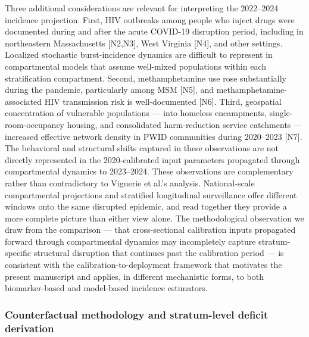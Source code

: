 \documentclass[11pt]{article}
\begin{document}
Three additional considerations are relevant for interpreting the 2022–2024 incidence projection. First, HIV outbreaks among people who inject drugs were documented during and after the acute COVID-19 disruption period, including in northeastern Massachusetts [N2,N3], West Virginia [N4], and other settings. Localized stochastic burst-incidence dynamics are difficult to represent in compartmental models that assume well-mixed populations within each stratification compartment. Second, methamphetamine use rose substantially during the pandemic, particularly among MSM [N5], and methamphetamine-associated HIV transmission risk is well-documented [N6]. Third, geospatial concentration of vulnerable populations — into homeless encampments, single-room-occupancy housing, and consolidated harm-reduction service catchments — increased effective network density in PWID communities during 2020–2023 [N7]. The behavioral and structural shifts captured in these observations are not directly represented in the 2020-calibrated input parameters propagated through compartmental dynamics to 2023–2024.
These observations are complementary rather than contradictory to Viguerie et al.'s analysis. National-scale compartmental projections and stratified longitudinal surveillance offer different windows onto the same disrupted epidemic, and read together they provide a more complete picture than either view alone. The methodological observation we draw from the comparison — that cross-sectional calibration inputs propagated forward through compartmental dynamics may incompletely capture stratum-specific structural disruption that continues past the calibration period — is consistent with the calibration-to-deployment framework that motivates the present manuscript and applies, in different mechanistic forms, to both biomarker-based and model-based incidence estimators.

\subsubsection{Counterfactual methodology and stratum-level deficit derivation}\label{sec:covid_methodology}
\end{document}
